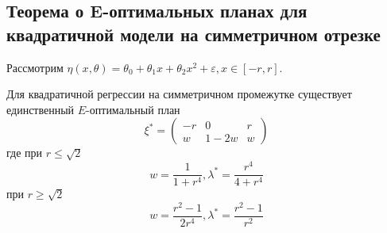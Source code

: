  \subsection{Теорема о E-оптимальных планах для квадратичной модели на симметричном отрезке}
 Рассмотрим $\eta(x,\theta) = \theta_0 + \theta_1 x + \theta_2 x^2 + \varepsilon, x \in [-r, r]$. 
 \begin{thm}
 Для квадратичной регрессии на симметричном промежутке существует единственный $E$-оптимальный план
 $$\xi^{*}  = \begin{pmatrix} -r & 0 & r \\ w & 1 -2w & w\end{pmatrix}$$
 где при $r\leq \sqrt{2}$
 $$w = \frac{1}{1+r^4}, \lambda^{*} = \frac{r^4}{4+r^4}$$
 при $r\geq\sqrt{2}$
 $$ w = \frac{r^2 - 1}{2r^4}, \lambda^{*} = \frac{r^2 - 1}{r^2}$$
 \end{thm}

